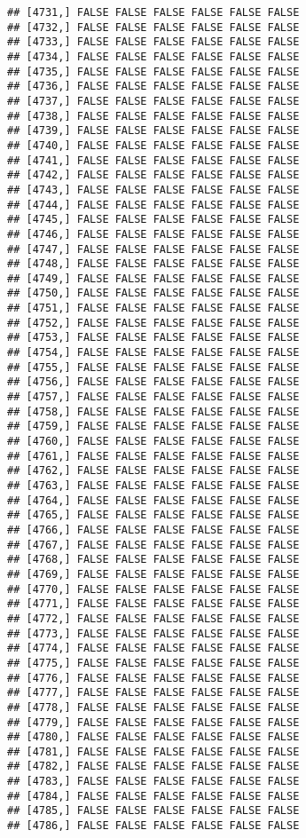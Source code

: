 \documentclass[
]{article}
\begin{document}
\begin{verbatim}
## [4731,] FALSE FALSE FALSE FALSE FALSE FALSE
## [4732,] FALSE FALSE FALSE FALSE FALSE FALSE
## [4733,] FALSE FALSE FALSE FALSE FALSE FALSE
## [4734,] FALSE FALSE FALSE FALSE FALSE FALSE
## [4735,] FALSE FALSE FALSE FALSE FALSE FALSE
## [4736,] FALSE FALSE FALSE FALSE FALSE FALSE
## [4737,] FALSE FALSE FALSE FALSE FALSE FALSE
## [4738,] FALSE FALSE FALSE FALSE FALSE FALSE
## [4739,] FALSE FALSE FALSE FALSE FALSE FALSE
## [4740,] FALSE FALSE FALSE FALSE FALSE FALSE
## [4741,] FALSE FALSE FALSE FALSE FALSE FALSE
## [4742,] FALSE FALSE FALSE FALSE FALSE FALSE
## [4743,] FALSE FALSE FALSE FALSE FALSE FALSE
## [4744,] FALSE FALSE FALSE FALSE FALSE FALSE
## [4745,] FALSE FALSE FALSE FALSE FALSE FALSE
## [4746,] FALSE FALSE FALSE FALSE FALSE FALSE
## [4747,] FALSE FALSE FALSE FALSE FALSE FALSE
## [4748,] FALSE FALSE FALSE FALSE FALSE FALSE
## [4749,] FALSE FALSE FALSE FALSE FALSE FALSE
## [4750,] FALSE FALSE FALSE FALSE FALSE FALSE
## [4751,] FALSE FALSE FALSE FALSE FALSE FALSE
## [4752,] FALSE FALSE FALSE FALSE FALSE FALSE
## [4753,] FALSE FALSE FALSE FALSE FALSE FALSE
## [4754,] FALSE FALSE FALSE FALSE FALSE FALSE
## [4755,] FALSE FALSE FALSE FALSE FALSE FALSE
## [4756,] FALSE FALSE FALSE FALSE FALSE FALSE
## [4757,] FALSE FALSE FALSE FALSE FALSE FALSE
## [4758,] FALSE FALSE FALSE FALSE FALSE FALSE
## [4759,] FALSE FALSE FALSE FALSE FALSE FALSE
## [4760,] FALSE FALSE FALSE FALSE FALSE FALSE
## [4761,] FALSE FALSE FALSE FALSE FALSE FALSE
## [4762,] FALSE FALSE FALSE FALSE FALSE FALSE
## [4763,] FALSE FALSE FALSE FALSE FALSE FALSE
## [4764,] FALSE FALSE FALSE FALSE FALSE FALSE
## [4765,] FALSE FALSE FALSE FALSE FALSE FALSE
## [4766,] FALSE FALSE FALSE FALSE FALSE FALSE
## [4767,] FALSE FALSE FALSE FALSE FALSE FALSE
## [4768,] FALSE FALSE FALSE FALSE FALSE FALSE
## [4769,] FALSE FALSE FALSE FALSE FALSE FALSE
## [4770,] FALSE FALSE FALSE FALSE FALSE FALSE
## [4771,] FALSE FALSE FALSE FALSE FALSE FALSE
## [4772,] FALSE FALSE FALSE FALSE FALSE FALSE
## [4773,] FALSE FALSE FALSE FALSE FALSE FALSE
## [4774,] FALSE FALSE FALSE FALSE FALSE FALSE
## [4775,] FALSE FALSE FALSE FALSE FALSE FALSE
## [4776,] FALSE FALSE FALSE FALSE FALSE FALSE
## [4777,] FALSE FALSE FALSE FALSE FALSE FALSE
## [4778,] FALSE FALSE FALSE FALSE FALSE FALSE
## [4779,] FALSE FALSE FALSE FALSE FALSE FALSE
## [4780,] FALSE FALSE FALSE FALSE FALSE FALSE
## [4781,] FALSE FALSE FALSE FALSE FALSE FALSE
## [4782,] FALSE FALSE FALSE FALSE FALSE FALSE
## [4783,] FALSE FALSE FALSE FALSE FALSE FALSE
## [4784,] FALSE FALSE FALSE FALSE FALSE FALSE
## [4785,] FALSE FALSE FALSE FALSE FALSE FALSE
## [4786,] FALSE FALSE FALSE FALSE FALSE FALSE

\end{verbatim}
\end{document}
